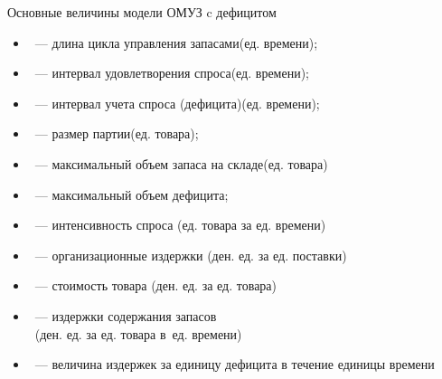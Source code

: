 \documentclass[unicode,11pt,notheorems,xcolor=table]{beamer}
\begin{document}
\begin{frame}{Основные величины модели ОМУЗ c дефицитом}
    \begin{itemize}
        \item {}~---  длина цикла управления запасами\hfill (ед. времени);
        \item {}~--- интервал удовлетворения спроса\hfill (ед. времени);
        \item {}~--- интервал учета спроса (дефицита)\hfill (ед. времени);        
        \item {}~--- размер партии\hfill (ед. товара);
        \item {}~--- максимальный объем запаса на складе\hfill (ед. товара)
        \item  {}~--- максимальный объем дефицита;
        \item {}~--- интенсивность спроса  \hfill
            (ед. товара за ед. времени)
        \item {}~--- организационные издержки \hfill (ден. ед. за ед. поставки)
        \item  {}~--- стоимость товара \hfill  (ден. ед. за ед. товара)
        \item {}~--- издержки содержания запасов \\~\hfill (ден. ед. за ед. товара в~ед. времени)
        \item {}~--- величина издержек за единицу дефицита в течение единицы времени
    \end{itemize}
    \end{frame}
\end{document}
